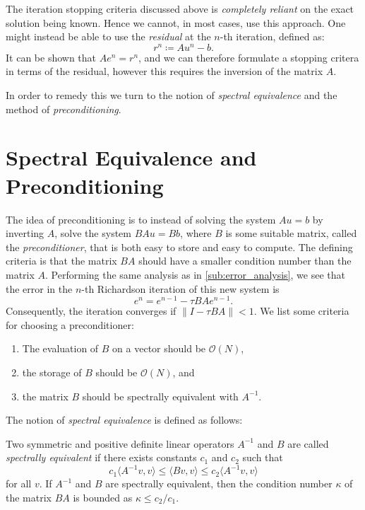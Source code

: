 The iteration stopping criteria discussed above is \emph{completely reliant} on
the exact solution being known. Hence we cannot, in most cases, use this
approach. One might instead be able to use the \emph{residual} at the \(n\)-th
iteration, defined as:
\begin{equation}
    r^n \coloneqq Au^n - b.
\end{equation}
It can be shown that \(Ae^n = r^n \), and we can therefore formulate a stopping
critera in terms of the residual, however this requires the inversion of the
matrix \( A \).

In order to remedy this we turn to the notion of \emph{spectral equivalence}
and the method of \emph{preconditioning}.

\section{Spectral Equivalence and Preconditioning}
\label{sec:spectral_equivalence_and_preconditioning}

The idea of preconditioning is to instead of solving the system \( A u = b \)
by inverting \( A \), solve the system \( B A u = B b \), where \( B \) is some
suitable matrix, called the \emph{preconditioner}, that is both easy to store
and easy to compute. The defining criteria is that the matrix \( B A \) should
have a smaller condition number than the matrix \( A \). Performing the same
analysis as in \vref{sub:error_analysis}, we see that the error in the \(n\)-th
Richardson iteration of this new system is
\begin{equation}
    e^n = e^{n-1} - \tau B A e^{n-1}.
\end{equation}
Consequently, the iteration converges if \( \|I - \tau B A \| < 1 \).  We list
some criteria for choosing a preconditioner:
\begin{enumerate}
    \item The evaluation of \(B\) on a vector should be \( \mathcal{O}(N) \), 
    \item the storage of \(B\) should be \( \mathcal{O}(N) \), and
    \item the matrix \(B\) should be spectrally equivalent with \( A^{-1} \).
\end{enumerate}
The notion of \emph{spectral equivalence} is defined as follows:
\begin{definition}
    Two symmetric and positive definite linear operators \( A^{-1} \) and \( B
    \) are called \emph{spectrally equivalent} if there exists constants \( c_1
    \) and \( c_2 \) such that
    \begin{equation}
        c_1 \langle A^{-1}v, v \rangle \leq \langle Bv, v \rangle \leq c_2
        \langle A^{-1}v, v \rangle
    \end{equation}
    for all \( v \). If \( A^{-1} \) and \( B \) are spectrally equivalent,
    then the condition number \( \kappa \) of the matrix \( BA\) is bounded as
    \( \kappa \leq c_2 / c_1 \).
\end{definition}


